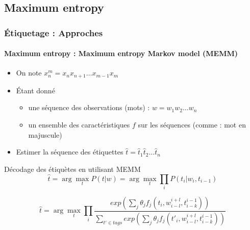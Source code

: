 \documentclass[xcolor=table]{beamer}
\begin{document}
\subsection{Maximum entropy}

\begin{frame}
\frametitle{Étiquetage : Approches}
\framesubtitle{Maximum entropy : Maximum entropy Markov model (MEMM)}

\begin{itemize}
	\item On note $x_{n}^{m} = x_n x_{n+1} \ldots x_{m-1} x_m$
	\item Étant donné 
	\begin{itemize}
		\item une séquence des observations (mots) : $w = w_1 w_2 \ldots w_n$
		\item un ensemble des caractéristiques $f$ sur les séquences (comme : mot en majuscule)
	\end{itemize}
	\item Estimer la séquence des étiquettes $\hat{t} = \hat{t}_1 \hat{t}_2 \ldots \hat{t}_n$
\end{itemize}

\begin{block}{Décodage des étiquètes en utilisant MEMM}
	\[
	\hat{t} = \arg\max\limits_t P(t | w) = \arg\max\limits_t \prod\limits_{i}  P(t_i | w_i, t_{i-1})
	\]
	
	\[
	\hat{t} = \arg\max\limits_t \prod\limits_{i}  
	\frac{exp\left(\sum_j \theta_j f_j(t_i, w_{i-l}^{i+l}, t_{i-k}^{i-1})\right)}%
	{\sum_{t' \in tags} exp\left(\sum_j \theta_j f_j(t'_i, w_{i-l}^{i+l}, t_{i-k}^{i-1})\right)}
	\]

\end{block}

\end{frame}
\end{document}
